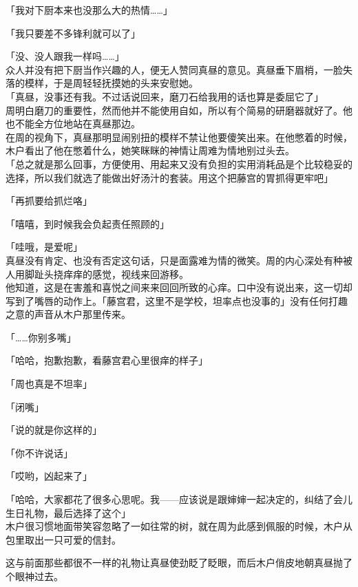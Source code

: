 「我对下厨本来也没那么大的热情……」

「我只要差不多锋利就可以了」

「没、没人跟我一样吗……」\\

众人并没有把下厨当作兴趣的人，便无人赞同真昼的意见。真昼垂下眉梢，一脸失落的模样，于是周轻轻抚摸她的头来安慰她。\\

「真昼，没事还有我。不过话说回来，磨刀石给我用的话也算是委屈它了」\\

周明白磨刀的重要性，然而他并不能使用自如，所以有个简易的研磨器就好了。他也不能全方位地站在真昼那边。\\

在周的视角下，真昼那明显闹别扭的模样不禁让他要傻笑出来。在他憋着的时候，木户看出了他在憋着什么，她笑眯眯的神情让周难为情地别过头去。\\

「总之就是那么回事，方便使用、用起来又没有负担的实用消耗品是个比较稳妥的选择，所以我们就选了能做出好汤汁的套装。用这个把藤宫的胃抓得更牢吧」

「再抓要给抓烂咯」

「嘻嘻，到时候我会负起责任照顾的」

「哇哦，是爱呢」\\

真昼没有肯定、也没有否定这句话，只是面露难为情的微笑。周的内心深处有种被人用脚趾头挠痒痒的感觉，视线来回游移。\\

他知道，这是在害羞和喜悦之间来来回回所致的心痒。口中没有说出来，这一切却写到了嘴唇的动作上。「藤宫君，这里不是学校，坦率点也没事的」没有任何打趣之意的声音从木户那里传来。

「……你别多嘴」

「哈哈，抱歉抱歉，看藤宫君心里很痒的样子」

「周也真是不坦率」

「闭嘴」

「说的就是你这样的」

「你不许说话」

「哎哟，凶起来了」

「哈哈，大家都花了很多心思呢。我——应该说是跟婶婶一起决定的，纠结了会儿生日礼物，最后选择了这个」\\

木户很习惯地面带笑容忽略了一如往常的树，就在周为此感到佩服的时候，木户从包里取出一只可爱的信封。

这与前面那些都很不一样的礼物让真昼使劲眨了眨眼，而后木户俏皮地朝真昼抛了个眼神过去。\\

